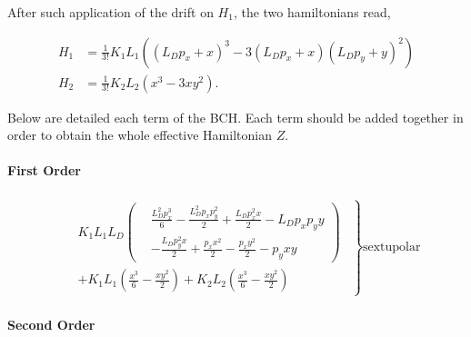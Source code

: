 After such application of the drift on $H_1$, the two hamiltonians read,

\begin{equation}
  \begin{aligned}
    H_1 &= \frac{1}{3!} K_{1} L_{1} \left(\left(L_{D} p_{x} + x\right)^{3} - 3 \left(L_{D} p_{x} + x\right) \left(L_{D} p_{y} + y\right)^{2}\right) \\
    H_2 &= \frac{1}{3!} K_{2} L_{2} \left(x^{3} - 3 x y^{2}\right).
  \end{aligned}
\end{equation}

Below are detailed each term of the BCH. Each term should be added together in order to obtain the
whole effective Hamiltonian $Z$.

\paragraph{First Order}

\footnotesize
\begin{equation}
    \begin{aligned}
      & \left.
      \begin{aligned}
        &K_1 L_{1} L_{D} \left(
        \begin{aligned}
          &\frac{L_{D}^{2} p_{x}^{3}}{6} - \frac{L_{D}^{2} p_{x} p_{y}^{2}}{2} + \frac{L_{D} p_{x}^{2} x}{2} - L_{D} p_{x} p_{y} y \\
          &- \frac{L_{D} p_{y}^{2} x}{2} + \frac{p_{x} x^{2}}{2} - \frac{p_{x} y^{2}}{2} - p_{y} x y
        \end{aligned}\right)\\
        &+ K_1 L_{1} \left(\frac{x^{3}}{6} - \frac{x y^{2}}{2}\right) + K_{2} L_{2} \left(\frac{x^{3}}{6} - \frac{x y^{2}}{2}\right)
      \end{aligned}
      \;\,\right\} \text{sextupolar}
    \end{aligned}
\end{equation}
\normalsize

\paragraph{Second Order}

